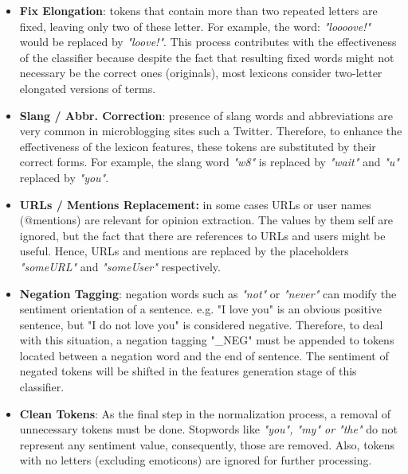\begin{itemize}
\itemsep0em 

\item \textbf{Fix Elongation}: tokens that contain more than two repeated letters are fixed, leaving only two of these letter. For example, the word: \textit{"loooove!"} would be replaced by \textit{"loove!"}. This process contributes with the effectiveness of the classifier because despite the fact that resulting fixed words might not necessary be the correct ones (originals), most lexicons consider two-letter elongated versions of terms.   

\item \textbf{Slang / Abbr. Correction}: presence of slang words and abbreviations are very common in microblogging sites such a Twitter. Therefore, to enhance the effectiveness of the lexicon features, these tokens are substituted by their correct forms. For example, the slang word \textit{"w8"} is replaced by \textit{"wait"} and \textit{"u"} replaced by \textit{"you"}. 

\item \textbf{URLs / Mentions Replacement:} in some cases URLs or user names (@mentions) are relevant for opinion extraction. The values by them self are ignored, but the fact that there are references to URLs and users might be useful. Hence, URLs and mentions are replaced by the placeholders \textit{"someURL"} and \textit{"someUser"} respectively.

\item \textbf{Negation Tagging}: negation words such as \textit{"not"} or \textit{"never"} can modify the sentiment orientation of a sentence. e.g. "I love you" is an obvious positive sentence, but "I do not love you" is considered negative. Therefore, to deal with this situation, a negation tagging "\_NEG" must be appended to tokens located between a negation word and the end of sentence. The sentiment of negated tokens will be shifted in the features generation stage of this classifier.  

\item \textbf{Clean Tokens}: As the final step in the normalization process, a removal of unnecessary tokens must be done. Stopwords like \textit{"you", "my" or "the"} do not represent any sentiment value, consequently, those are removed. Also, tokens with no letters (excluding emoticons) are ignored for further processing. 

\end{itemize}

